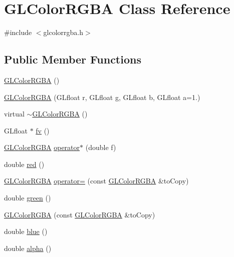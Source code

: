 \hypertarget{classGLColorRGBA}{
\section{\-G\-L\-Color\-R\-G\-B\-A \-Class \-Reference}
\label{d5/d16/classGLColorRGBA}
}


{\ttfamily \#include $<$glcolorrgba.\-h$>$}

\subsection*{\-Public \-Member \-Functions}
\begin{DoxyCompactItemize}
\item 
\hyperlink{classGLColorRGBA_a622416deabcdf958803df4116d129668}{\-G\-L\-Color\-R\-G\-B\-A} ()
\item 
\hyperlink{classGLColorRGBA_a0e30c57b5124de32a960fa2c10e8647f}{\-G\-L\-Color\-R\-G\-B\-A} (\-G\-Lfloat r, \-G\-Lfloat g, \-G\-Lfloat b, \-G\-Lfloat a=1.)
\item 
virtual \hyperlink{classGLColorRGBA_ae8a41d5c5c644159b27170e8c78370ee}{$\sim$\-G\-L\-Color\-R\-G\-B\-A} ()
\item 
\-G\-Lfloat $\ast$ \hyperlink{classGLColorRGBA_a8e08d6f347035b7ee5598942242f4bd9}{fv} ()
\item 
\hyperlink{classGLColorRGBA}{\-G\-L\-Color\-R\-G\-B\-A} \hyperlink{classGLColorRGBA_a7dc45f291406b0fb123c682433a7cab2}{operator$\ast$} (double f)
\item 
double \hyperlink{classGLColorRGBA_a00482c0011af9e85130329704651228c}{red} ()
\item 
\hyperlink{classGLColorRGBA}{\-G\-L\-Color\-R\-G\-B\-A} \hyperlink{classGLColorRGBA_a2978f6eaf48b7ee9e7e166e053b63096}{operator=} (const \hyperlink{classGLColorRGBA}{\-G\-L\-Color\-R\-G\-B\-A} \&to\-Copy)
\item 
double \hyperlink{classGLColorRGBA_a0c23858051c491cb34cc66eeb4b6ff8c}{green} ()
\item 
\hyperlink{classGLColorRGBA_a11acdaa5e4efb01b8799340678ebe39a}{\-G\-L\-Color\-R\-G\-B\-A} (const \hyperlink{classGLColorRGBA}{\-G\-L\-Color\-R\-G\-B\-A} \&to\-Copy)
\item 
double \hyperlink{classGLColorRGBA_ab2bd6122d3957fbe86f35fc884b222f1}{blue} ()
\item 
double \hyperlink{classGLColorRGBA_ad3ee42fecad2e51b8a96aa9dbfae8387}{alpha} ()
\end{DoxyCompactItemize}
